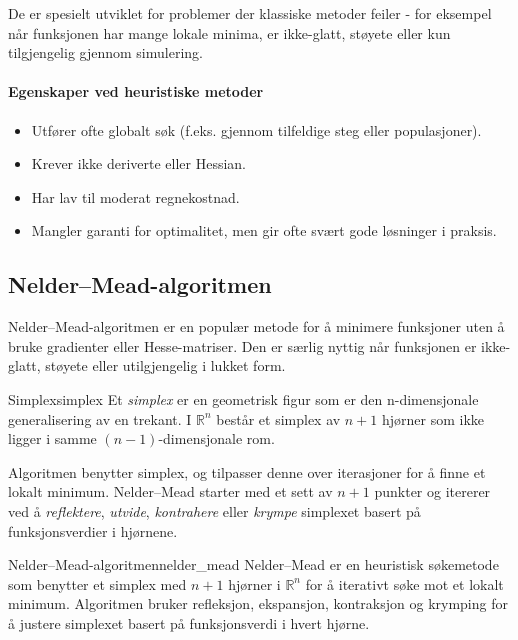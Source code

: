 De er spesielt utviklet for problemer der klassiske metoder feiler - for eksempel når funksjonen har mange lokale minima, er ikke-glatt, støyete eller kun tilgjengelig gjennom simulering.

\paragraph{Egenskaper ved heuristiske metoder}

\begin{itemize}
	\item Utfører ofte globalt søk (f.eks. gjennom tilfeldige steg eller populasjoner).
	\item Krever ikke deriverte eller Hessian.
	\item Har lav til moderat regnekostnad.
	\item Mangler garanti for optimalitet, men gir ofte svært gode løsninger i praksis.
\end{itemize}

\subsection{Nelder--Mead-algoritmen}
\label{sec:nelder_mead}

Nelder--Mead-algoritmen er en populær metode for å minimere funksjoner uten å bruke gradienter eller Hesse-matriser.
Den er særlig nyttig når funksjonen er ikke-glatt, støyete eller utilgjengelig i lukket form.

\begin{definition}{Simplex}{simplex}
    Et \emph{simplex} er en geometrisk figur som er den n-dimensjonale generalisering av en trekant. I $\mathbb{R}^n$ består et simplex av $n+1$ hjørner som ikke ligger i samme $(n-1)$-dimensjonale rom.
\end{definition}

Algoritmen benytter simplex, og tilpasser denne over iterasjoner for å finne et lokalt minimum.
Nelder--Mead starter med et sett av \( n+1 \) punkter og itererer ved å \emph{reflektere}, \emph{utvide}, \emph{kontrahere} eller \emph{krympe} simplexet basert på funksjonsverdier i hjørnene.

\begin{definition}{Nelder--Mead-algoritmen}{nelder_mead}
	Nelder--Mead er en heuristisk søkemetode som benytter et simplex med \( n+1 \) hjørner i \( \mathbb{R}^n \) for å iterativt søke mot et lokalt minimum.
	Algoritmen bruker refleksjon, ekspansjon, kontraksjon og krymping for å justere simplexet basert på funksjonsverdi i hvert hjørne.
\end{definition}

